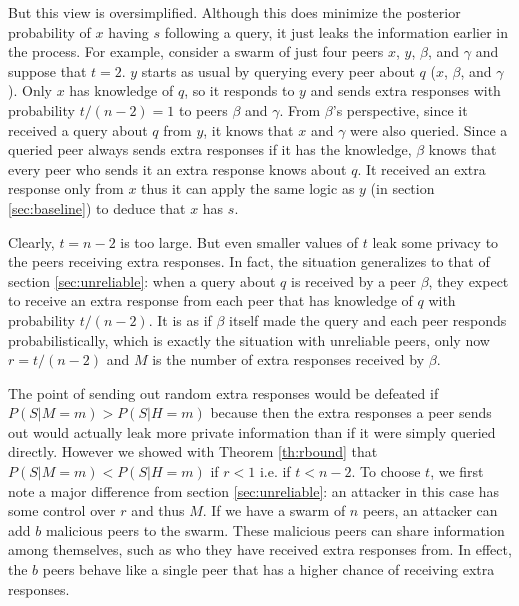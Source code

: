 \documentclass{article}
\newcommand{\secref}[1]{section \ref{sec:#1}}
\newcommand{\thref}[1]{Theorem \ref{th:#1}}
\begin{document}
But this view is oversimplified. Although this does minimize the posterior
probability of $x$ having $s$ following a query, it just leaks the
information earlier in the process. For example, consider a swarm of just four
peers $x$, $y$, $\beta$, and $\gamma$ and suppose that $t=2$. $y$ starts as usual by
querying every peer about $q$ ($x$, $\beta$, and $\gamma$). Only $x$ has knowledge of
$q$, so it responds to $y$ and sends extra responses with probability
$t/(n-2)=1$ to peers $\beta$ and $\gamma$. From $\beta$'s perspective, since it received a
query about $q$ from $y$, it knows that $x$ and $\gamma$ were also queried. Since a
queried peer always sends extra responses if it has the knowledge, $\beta$ knows that
every peer who sends it an extra response knows about $q$. It received an extra
response only from $x$ thus it can apply the same logic as $y$ (in
\secref{baseline}) to deduce that $x$ has $s$.

Clearly, $t=n-2$ is too large. But even smaller values of $t$ leak some privacy to the
peers receiving extra responses. In fact, the situation generalizes to that of
\secref{unreliable}: when a query about $q$ is received by a peer $\beta$,
they expect to receive an extra response from each peer that has knowledge of
$q$ with probability $t/(n-2)$. It is as if $\beta$ itself made the query and each
peer responds probabilistically, which is exactly the situation with unreliable
peers, only now $r=t/(n-2)$ and $M$ is the number of extra responses received by
$\beta$.

The point of sending out random extra responses would be defeated if
$P(S|M=m)>P(S|H=m)$ because then the extra responses a peer sends out would
actually leak more private information than if it were simply queried directly.
However we showed with \thref{rbound} that $P(S|M=m)<P(S|H=m)$ if $r<1$ i.e. if
$t<n-2$.
To choose $t$, we first note
a major difference from \secref{unreliable}: an attacker in this case
has some control over $r$ and thus $M$. If we have a swarm of $n$ peers,
an attacker can add $b$ malicious peers to the swarm. These malicious peers can
share information among themselves, such as who they have received extra
responses from. In effect, the $b$ peers behave like a single peer that has a
higher chance of receiving extra responses.
\end{document}
